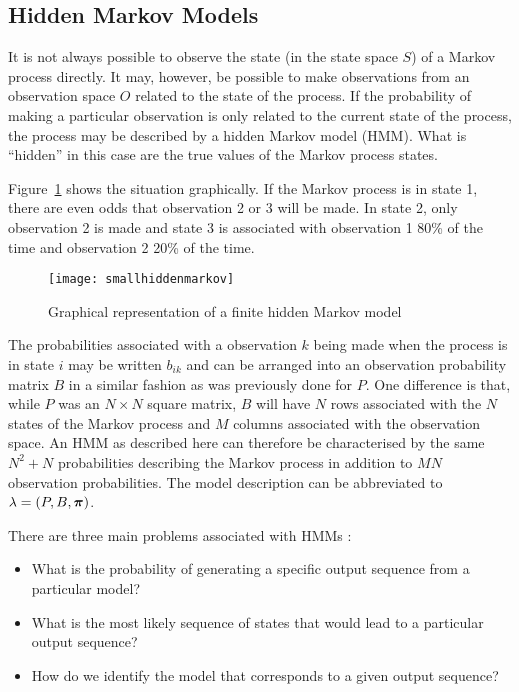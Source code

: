 \subsection{Hidden Markov Models} 
It is not always possible to observe the state (in the state space $S$) of a Markov process directly. 
It may, however, be possible to make observations from an observation space $O$ related to the state of the process.
If the probability of making a particular observation is only related to the current state of the process, the process may be described by a hidden Markov model (HMM).
What is ``hidden'' in this case are the true values of the Markov process states.

Figure~\ref{fig:hiddenmarkov} shows the situation graphically.
If the Markov process is in state 1, there are even odds that observation 2 or 3 will be made.
In state 2, only observation 2 is made and state 3 is associated with observation 1 80\% of the time and observation 2 20\% of the time.

\begin{figure}[htbp]
  \centering
  \texttt{[image: smallhiddenmarkov]}
  \caption{Graphical representation of a finite hidden Markov model}
  \label{fig:hiddenmarkov}
\end{figure}

The probabilities associated with a observation $k$ being made when the process is in state $i$ may be written $b_{ik}$ and can be arranged into an observation probability matrix $B$ in a similar fashion as was previously done for $P$. 
One difference is that, while $P$ was an $N \times N$ square matrix, $B$ will have $N$ rows associated with the $N$ states of the Markov process and $M$ columns associated with the observation space. 
An HMM as described here can therefore be characterised by the same $N^2+N$ probabilities describing the Markov process in addition to $MN$ observation probabilities.  
The model description can be abbreviated to $\lambda = (P, B, \boldsymbol{\pi})$.

There are three main problems associated with HMMs \citep{gamerman.lopes2006markov}:
\begin{itemize}
\item What is the probability of generating a specific output sequence from a particular model?
\item What is the most likely sequence of states that would lead to a particular output sequence? 
\item How do we identify the model that corresponds to a given output sequence?
\end{itemize}

